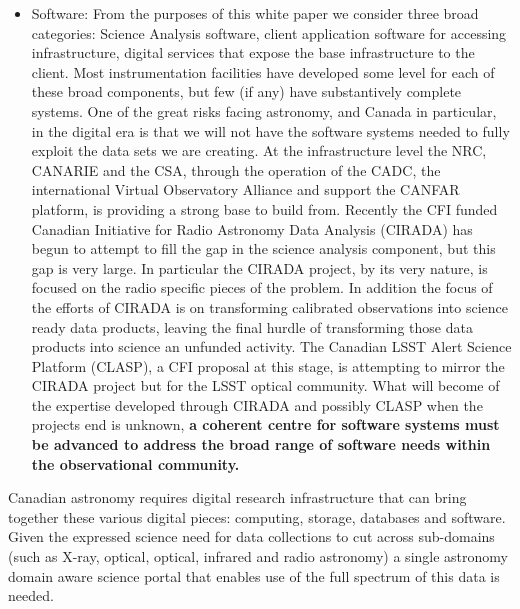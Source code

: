 \documentclass[11pt]{article}
\begin{document}
\begin{itemize}
    \item Software: From the purposes of this white paper we consider three broad categories: Science Analysis software, client application software for accessing infrastructure, digital services that expose the base infrastructure to the client.  Most instrumentation facilities have developed some level for each of these broad components, but few (if any) have substantively complete systems.  One of the great risks facing astronomy, and Canada in particular, in the digital era is that we  will not have the software systems needed to fully exploit the data sets we are creating.  At the infrastructure level the NRC, CANARIE and the CSA, through the operation of the CADC, the international Virtual Observatory Alliance and support the CANFAR platform, is providing a strong base to build from.  Recently the CFI funded Canadian Initiative for Radio Astronomy Data Analysis (CIRADA) has begun to attempt to fill the gap in the science analysis component, but this gap is very large.  In particular the CIRADA project, by its very nature, is focused on the radio specific pieces of the problem.  In addition the focus of the efforts of CIRADA is on transforming calibrated observations into science ready data products, leaving the final hurdle of transforming those data products into science an unfunded activity.  The Canadian LSST Alert Science Platform (CLASP), a CFI proposal at this stage, is attempting to mirror the CIRADA project but for the LSST optical community.  What will become of the expertise developed through CIRADA and possibly CLASP when the projects end is unknown, {\bf a coherent centre for software systems must be advanced to address the broad range of software needs within the observational community.}
\end{itemize}

Canadian astronomy requires digital research infrastructure that can bring together these various digital pieces:  computing, storage, databases and software.  Given the expressed science need for data collections to cut across sub-domains (such as X-ray, optical, optical, infrared and radio astronomy) a single astronomy domain aware science portal that enables use of the full spectrum of this data is needed.
\end{document}
